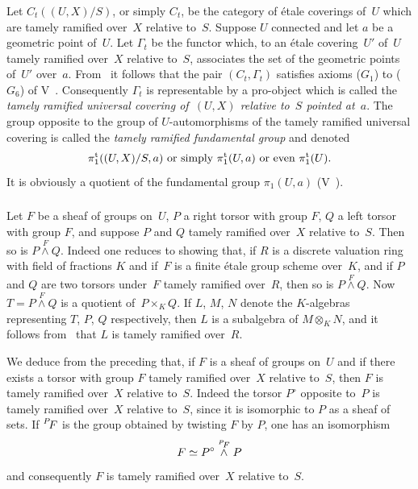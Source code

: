 \subsubsection{}
\label{XIII.2.1.3}
Let $C_t((U,X)/S)$, or simply $C_t$,
be the category of étale coverings of~$U$ which are
tamely ramified over~$X$ relative
to~$S$. Suppose $U$ connected and let $a$ be a
geometric point of~$U$. Let $\Gamma_t$ be the functor which, to an
étale covering~$U'$ of~$U$ tamely ramified
over~$X$ relative to~$S$, associates the set of the geometric
points of~$U'$ over~$a$. From~
it follows that the pair $(C_t,\Gamma_t)$ satisfies axioms
($G_1$) to ($G_6$) of V~. Consequently $\Gamma_t$ is
representable by a pro-object which is called the
\emph{tamely ramified universal covering
of~$(U,X)$ relative to~$S$ pointed at~$a$}.
The group opposite to the group of $U$-automorphisms of the
tamely ramified universal covering is called
the \emph{tamely ramified fundamental group}
and denoted
$$
\pi_1^{\mathrm{t}}((U,X)/S,a)\text{ or simply }\pi_1^{\mathrm{t}}(U,a)\text{ or
even }\pi_1^{\mathrm{t}}(U).
$$
It is obviously a quotient of the fundamental group $\pi_1(U,a)$
(V~).

\subsubsection{}
\label{XIII.2.1.4}
Let $F$ be a sheaf of groups on~$U$, $P$ a right torsor
with group $F$, $Q$ a left torsor with group $F$, and suppose
$P$ and $Q$ tamely ramified over~$X$ relative to~$S$. Then so is $P\stackrel{F}{\wedge}Q$. Indeed one
reduces to showing that, if $R$ is a discrete
valuation ring with field of fractions $K$ and if~$F$ is a
finite étale group scheme over~$K$, and if $P$ and $Q$ are
two torsors under~$F$ tamely ramified over~$R$, then
so is $P\stackrel{F}{\wedge} Q$. Now
$T=P\stackrel{F}{\wedge} Q$ is a quotient of~$P\times_K Q$. If $L$,
$M$, $N$ denote the $K$-algebras representing
$T$, $P$, $Q$ respectively, then $L$ is a subalgebra of
$M\otimes_K N$, and it follows from~ that $L$ is
tamely ramified over~$R$.

We deduce from the preceding that, if $F$ is a sheaf of
groups on~$U$ and if there exists a torsor with group $F$
tamely ramified over~$X$ relative to~$S$, then
$F$ is tamely ramified over~$X$ relative to~$S$. Indeed the torsor $P^{\circ}$ opposite to~$P$ is
tamely ramified over~$X$ relative to~$S$,
since it is isomorphic to $P$ as a sheaf of sets. If
$\leftexp{P\mkern-4mu}{F}$ is the group obtained by twisting $F$ by $P$, one has an
isomorphism
$$
F\simeq P^{\circ}\stackrel{\leftexp{P\mkern-4mu}{F}}{\wedge}P
$$
and consequently $F$ is tamely ramified over~$X$
relative to~$S$.

